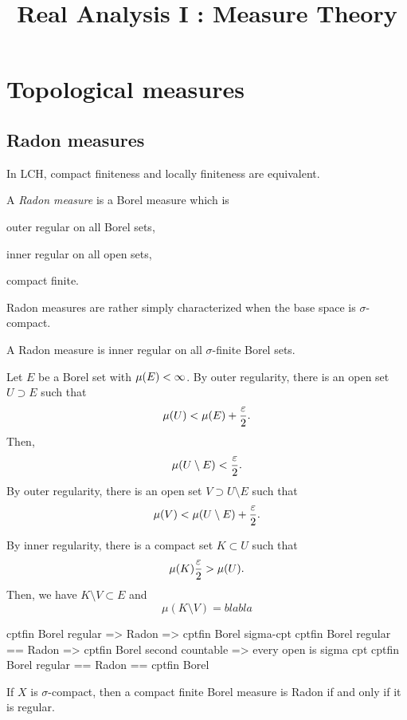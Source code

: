 \documentclass{../crs}
\title{Real Analysis I : Measure Theory}
\begin{document}
\maketitle
\tableofcontents




\chapter{Topological measures}

\section{Radon measures}
In LCH, compact finiteness and locally finiteness are equivalent.
\begin{defn}
A \emph{Radon measure} is a Borel measure which is
\begin{cond}
\item outer regular on all Borel sets,
\item inner regular on all open sets,
\item compact finite.
\end{cond}
\end{defn}

Radon measures are rather simply characterized when the base space is $\sigma$-compact.
\begin{thm}
A Radon measure is inner regular on all $\sigma$-finite Borel sets.
\end{thm}
\begin{pf}
Let $E$ be a Borel set with $\mu(E)<\infty$.
By outer regularity, there is an open set $U\supset E$ such that
\[\mu(U)<\mu(E)+\frac{\varepsilon}2.\]
Then,
\[\mu(U\setminus E)<\frac{\varepsilon}2.\]
By outer regularity, there is an open set $V\supset U\setminus E$ such that
\[\mu(V)<\mu(U\setminus E)+\frac{\varepsilon}2.\]

By inner regularity, there is a compact set $K\subset U$ such that
\[\mu(K)\frac{\varepsilon}2>\mu(U).\]
Then, we have $K\setminus V\subset E$ and
\[\mu(K\setminus V)=blabla\]
\end{pf}

												cptfin Borel regular => Radon => cptfin Borel
sigma-cpt											cptfin Borel regular == Radon => cptfin Borel
second countable => every open is sigma cpt			cptfin Borel regular == Radon == cptfin Borel

\begin{cor}
If $X$ is $\sigma$-compact, then a compact finite Borel measure is Radon if and only if it is regular.
\end{cor}
\end{document}
